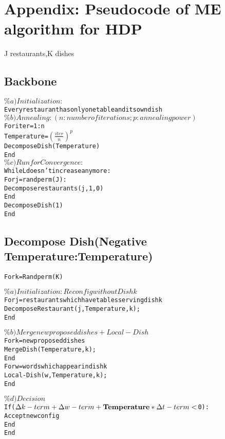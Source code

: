 \documentclass{article}
\begin{document}
\section{Appendix: Pseudocode of ME algorithm for HDP}
J restaurants,K dishes
\subsection{Backbone}
\begin{alltt}
  \(\%a)Initialization:\)
      Every restaurant has only one table and its own dish
  \(\%b)Annealing:(n:number of iterations; p:annealing power)\)
      For iter=1:n
          Temperature=\((\frac{iter}{n})^p\)
          Decompose Dish(Temperature)
      End
  \(\%c)Run for Convergence:\)
      While L doesn't increase any more:          
          For j=randperm(J):
              Decompose restaurants(j,1,0)
          End
          Decompose Dish(1)
      End
\end{alltt}
\subsection{Decompose Dish(Negative Temperature:Temperature)}
\begin{alltt}
For k=Randperm(K)

   \(\%a)Initialization: Reconfig without Dish k\)
      For j=restaurants which have tables serving dish k
          Decompose Restaurant(j,Temperature,k);
      End

   \(\%b)Merge new proposed dishes+Local-Dish\)
      For k=new proposed dishes
          Merge Dish(Temperature,k);
      End     
      For w=words which appear in dish k
          Local-Dish(w,Temperature,k);
      End 

   \(\%d)Decision\)
      If(\(\Delta k-term+\Delta w-term+{\bf Temperature}*\Delta t-term<\)0):
          Accept new config
      End
End
\end{alltt}
\end{document}
